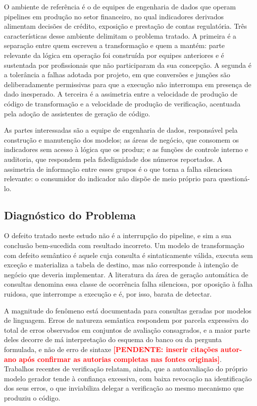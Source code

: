 \documentclass[11pt,a4paper]{article}
\newcommand{\pend}[1]{\textcolor{red}{\textbf{[PENDENTE: #1]}}}
\begin{document}
O ambiente de referência é o de equipes de engenharia de dados que operam
pipelines em produção no setor financeiro, no qual indicadores derivados
alimentam decisões de crédito, exposição e prestação de contas
regulatória. Três características desse ambiente delimitam o problema
tratado. A primeira é a separação entre quem escreveu a transformação e
quem a mantém: parte relevante da lógica em operação foi construída por
equipes anteriores e é sustentada por profissionais que não participaram
da sua concepção. A segunda é a tolerância a falhas adotada por projeto,
em que conversões e junções são deliberadamente permissivas para que a
execução não interrompa em presença de dado inesperado. A terceira é a
assimetria entre a velocidade de produção de código de transformação e a
velocidade de produção de verificação, acentuada pela adoção de
assistentes de geração de código.

As partes interessadas são a equipe de engenharia de dados, responsável
pela construção e manutenção dos modelos; as áreas de negócio, que
consomem os indicadores sem acesso à lógica que os produz; e as funções de
controle interno e auditoria, que respondem pela fidedignidade dos números
reportados. A assimetria de informação entre esses grupos é o que torna a
falha silenciosa relevante: o consumidor do indicador não dispõe de meio
próprio para questioná-lo.

\subsection{Diagnóstico do Problema}

O defeito tratado neste estudo não é a interrupção do pipeline, e sim a
sua conclusão bem-sucedida com resultado incorreto. Um modelo de
transformação com defeito semântico é aquele cuja consulta é sintaticamente
válida, executa sem exceção e materializa a tabela de destino, mas não
corresponde à intenção de negócio que deveria implementar. A literatura da
área de geração automática de consultas denomina essa classe de ocorrência
falha silenciosa, por oposição à falha ruidosa, que interrompe a execução e
é, por isso, barata de detectar.

A magnitude do fenômeno está documentada para consultas geradas por
modelos de linguagem. Erros de natureza semântica respondem por parcela
expressiva do total de erros observados em conjuntos de avaliação
consagrados, e a maior parte deles decorre de má interpretação do esquema
do banco ou da pergunta formulada, e não de erro de sintaxe
\pend{inserir citações autor-ano após confirmar as autorias completas nas
fontes originais}. Trabalhos recentes de verificação relatam, ainda, que a
autoavaliação do próprio modelo gerador tende à confiança excessiva, com
baixa revocação na identificação dos seus erros, o que inviabiliza
delegar a verificação ao mesmo mecanismo que produziu o código.
\end{document}
